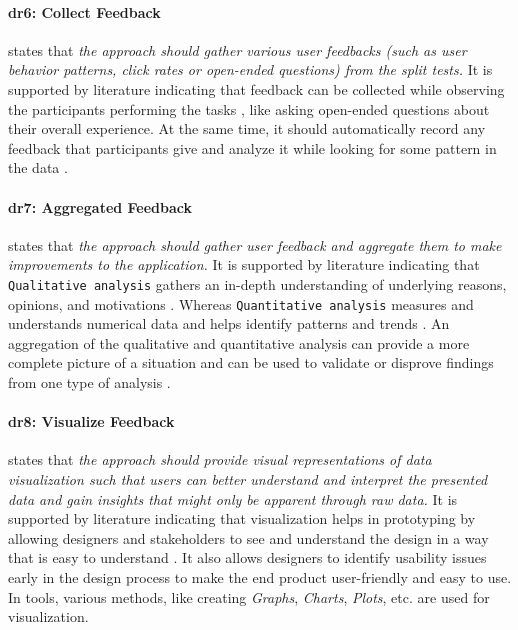 \paragraph{\ac{dr}6: Collect Feedback} states that \textit{the approach should gather various user feedbacks (such as user behavior patterns, click rates or open-ended questions) from the split tests.}
It is supported by literature indicating that feedback can be collected while observing the participants performing the tasks \cite{misc:qualitative:qualitative}, like asking open-ended questions about their overall experience.
At the same time, it should automatically record any feedback that participants give and analyze it while looking for some pattern in the data \cite{article:qqa:young}.

\paragraph{\ac{dr}7: Aggregated Feedback} states that \textit{the approach should gather user feedback and aggregate them to make improvements to the application.} 
It is supported by literature indicating that \texttt{Qualitative analysis} gathers an in-depth understanding of underlying reasons, opinions, and motivations \cite{misc:dsr:mayring}.
Whereas \texttt{Quantitative analysis} measures and understands numerical data and helps identify patterns and trends \cite{article:qqa:young}.
An aggregation of the qualitative and quantitative analysis can provide a more complete picture of a situation and can be used to validate or disprove findings from one type of analysis \cite{article:qq:helena}.

\paragraph{\ac{dr}8: Visualize Feedback} states that \textit{the approach should provide visual representations of data visualization such that users can better understand and interpret the presented data and gain insights that might only be apparent through raw data.} 
It is supported by literature indicating that visualization helps in prototyping by allowing designers and stakeholders to see and understand the design in a way that is easy to understand \cite{article:comparative:prototypes}.
It also allows designers to identify usability issues \cite{article:prototyping:gould} early in the design process to make the end product user-friendly and easy to use.
In tools, various methods, like creating \textit{Graphs}, \textit{Charts}, \textit{Plots}, etc. are used for visualization.

